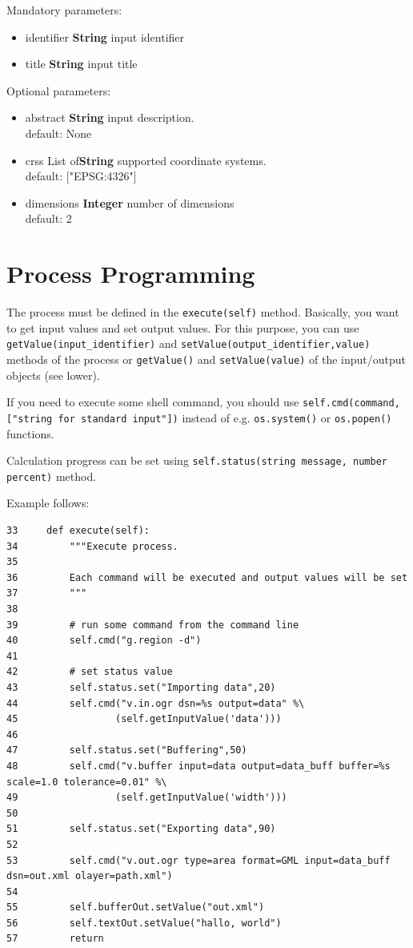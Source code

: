 \documentclass[a4paper,11pt]{report}
\begin{document}
Mandatory parameters:
\begin{itemize}
\item identifier \textbf{String} input identifier
\item title \textbf{String} input title
\end{itemize}

Optional parameters:
\begin{itemize}
\item abstract \textbf{String} input description.\\
        default: None
\item crss List of\textbf {String} supported coordinate systems.\\
        default: ["EPSG:4326"]
\item dimensions \textbf{Integer} number of dimensions\\
        default: 2
\end{itemize}

\section{Process Programming}
    
The process must be defined in the \texttt{execute(self)} method. 
Basically, you want to get input values and set output values. For this
purpose, you can use \texttt{getValue(input\_identifier)} and
\texttt{setValue(output\_identifier,value)} methods of the process or
\texttt{getValue()} and \texttt{setValue(value)} of the input/output
objects (see lower).

If you need to execute some shell command, you should use
\texttt{self.cmd(command,["string for standard input"])} instead of e.g.
\texttt{os.system()} or \texttt{os.popen()} functions.

Calculation progress can be set using \texttt{self.status(string message,
number percent)} method.

Example follows:

\begin{verbatim}
33     def execute(self):
34         """Execute process.
35         
36         Each command will be executed and output values will be set
37         """
38 
39         # run some command from the command line
40         self.cmd("g.region -d")
41 
42         # set status value
43         self.status.set("Importing data",20)
44         self.cmd("v.in.ogr dsn=%s output=data" %\
45                 (self.getInputValue('data')))
46             
47         self.status.set("Buffering",50)
48         self.cmd("v.buffer input=data output=data_buff buffer=%s scale=1.0 tolerance=0.01" %\
49                 (self.getInputValue('width')))
50 
51         self.status.set("Exporting data",90)
52 
53         self.cmd("v.out.ogr type=area format=GML input=data_buff dsn=out.xml olayer=path.xml")
54         
55         self.bufferOut.setValue("out.xml")
56         self.textOut.setValue("hallo, world")
57         return
\end{verbatim}
\end{document}
